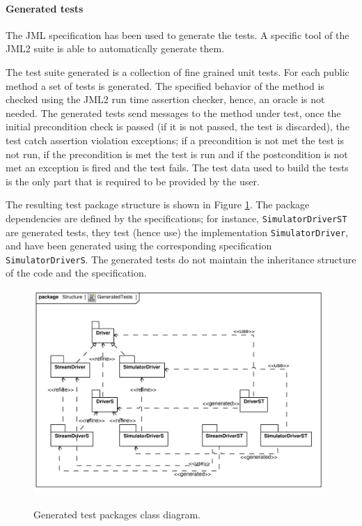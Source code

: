 \documentclass{article} \usepackage{times}
\newcommand{\lil}[1]{\texttt{\lstinline|#1|}}
\begin{document}
\paragraph*{Generated tests}

The JML specification has been used to generate the tests.  A specific
tool of the JML2 suite is able to automatically generate
them\cite{Cheon-Leavens02}.

The test suite generated is a collection of fine grained unit tests.
For each public method a set of tests is generated.  The specified
behavior of the method is checked using the JML2 run time assertion
checker, hence, an oracle is not needed.  The generated tests send
messages to the method under test, once the initial precondition check is passed (if it is not passed, the test is discarded), the test catch assertion violation
exceptions;
if a precondition is not met the test is not run, if the
precondition is met the test is run and if the postcondition is not
met an exception is fired and the test fails.  The test data
used to build the tests is the only part that is required to be
provided by the user.

The resulting test package structure is shown in Figure
\ref{fig:class_diagram_generatedtest}.  The package dependencies are
defined by the specifications; for instance, \lil{SimulatorDriverST}
are generated tests, they test (hence use) the implementation
\lil{SimulatorDriver}, and have been generated using the
corresponding specification \lil{SimulatorDriverS}.  The
generated tests do not maintain the inheritance structure of the code
and the specification.

\begin{figure}[htb!]
  \centering
  \includegraphics[scale=0.7]{UML_model/Class_Diagram__Structure__GeneratedTests}
  \label{fig:class_diagram_generatedtest}
  \caption{Generated test packages class diagram.}
\end{figure}
\end{document}
